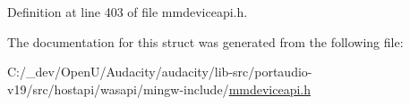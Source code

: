 Definition at line 403 of file mmdeviceapi.\+h.



The documentation for this struct was generated from the following file\+:\begin{DoxyCompactItemize}
\item 
C\+:/\+\_\+dev/\+Open\+U/\+Audacity/audacity/lib-\/src/portaudio-\/v19/src/hostapi/wasapi/mingw-\/include/\hyperlink{mmdeviceapi_8h}{mmdeviceapi.\+h}\end{DoxyCompactItemize}
